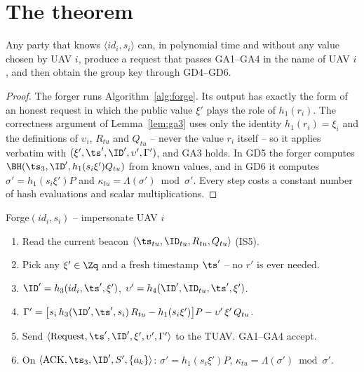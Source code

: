 \section{The theorem}
\begin{theorem}[TA forgery]\label{thm:taforge}
Any party that knows $\langle id_i,s_i\rangle$ can, in polynomial time and without any value chosen by UAV $i$, produce a request that passes GA1--GA4
in the name of UAV $i$, and then obtain the group key through GD4--GD6.
\end{theorem}
\begin{proof}
The forger runs Algorithm~\ref{alg:forge}. Its output has exactly the form of an honest request in which the public value $\xi'$ plays the role of
$h_1(r_i)$. The correctness argument of Lemma~\ref{lem:ga3} uses only the identity $h_1(r_i)=\xi_i$ and the definitions of $\upsilon_i$, $R_{tu}$ and
$Q_{tu}$ -- never the value $r_i$ itself -- so it applies verbatim with $(\xi',\ts',\ID',\upsilon',\Gamma')$, and GA3 holds. In GD5 the forger computes
$\BH(\ts_3,\ID',h_1(s_i\xi')Q_{tu})$ from known values, and in GD6 it computes $\sigma'=h_1(s_i\xi')P$ and $\kappa_{tu}=\Lambda(\sigma')\bmod\sigma'$.
Every step costs a constant number of hash evaluations and scalar multiplications.
\end{proof}

\begin{algorithm}{Forge$(id_i,s_i)$ -- impersonate UAV $i$}\label{alg:forge}
\begin{enumerate}[leftmargin=*,label=\arabic*.]
\item Read the current beacon $\langle\ts_{tu},\ID_{tu},R_{tu},Q_{tu}\rangle$ (IS5).
\item Pick any $\xi'\in\Zq$ and a fresh timestamp $\ts'$ -- no $r'$ is ever needed.
\item $\ID'=h_3(id_i,\ts',\xi')$, \quad $\upsilon'=h_4(\ID',\ID_{tu},\ts',\xi')$.
\item $\Gamma'=\big[s_i\,h_3(\ID',\ts',s_i)\,R_{tu}-h_1(s_i\xi')\big]P-\upsilon'\,\xi'\,Q_{tu}$.
\item Send $\langle\text{Request},\ts',\ID',\xi',\upsilon',\Gamma'\rangle$ to the TUAV. GA1--GA4 accept.
\item On $\langle\text{ACK},\ts_3,\ID',S',\{a_k\}\rangle$: $\sigma'=h_1(s_i\xi')P$, \;$\kappa_{tu}=\Lambda(\sigma')\bmod\sigma'$.
\end{enumerate}
\end{algorithm}

